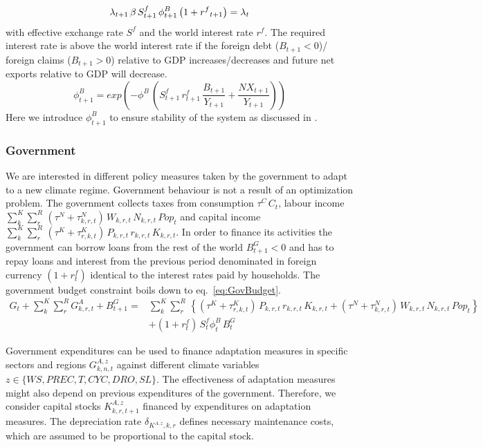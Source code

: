 \documentclass[10pt,a4paper]{article}
\begin{document}
\begin{dmath}\label{eq:hhfocbonds}
\lambda_{t+1} \, \beta \, S^{f}_{t+1} \, \phi^{B}_{t+1} \left(1+{{r^{f}}_{t+1}}\right) = \lambda_{t} \\
\end{dmath}
with effective exchange rate $S^f$ and the world interest rate $r^f$.
The required interest rate is above the world interest rate if the foreign debt ($B_{t+1}<0$)/ foreign claims ($B_{t+1}>0$) relative to GDP increases/decreases and future net exports relative to GDP will decrease. 
\begin{dmath}
\phi^{B}_{t+1} = exp \left(-\phi^B \,(S^{f}_{t+1} \, r^{f}_{t+1} \, \frac{B_{t+1}}{Y_{t+1}}+\frac{NX_{t+1}}{Y_{t+1}})\right)
\end{dmath}
Here we introduce $\phi^{B}_{t+1}$ to ensure stability of the system as discussed in \cite{schmitt2003closing}.


\subsubsection{Government}

We are interested in different policy measures taken by the government to adapt to a new climate regime. Government behaviour is not a result of an optimization problem. The government collects taxes from consumption $\tau^{C} \, C_{t}$, labour income $\sum_{k}^{K} \sum_{r}^{R} \, (\tau^{N} + \tau_{k,r,t}^{N}) \, W_{k,r,t} \, N_{k,r,t} \, Pop_{t}$ and capital income $\sum_{k}^{K} \sum_{r}^{R} \, (\tau^{K} + \tau_{r,k,t}^{K}) \, P_{k,r,t} \, r_{k,r,t} \, K_{k,r,t}$. In order to finance its activities the government can borrow loans from the rest of the world $B^{G}_{t+1}<0$ and has to repay loans and interest from the previous period denominated in foreign currency $(1 + r^{f}_{t})$ identical to the interest rates paid by households. The government budget constraint boils down to eq.~\ref{eq:GovBudget}.
\begin{align}\label{eq:GovBudget}
G_{t} + \sum_{k}^{K} \sum_{r}^{R} G^{A}_{k,r,t} + B^G_{t+1} =& \sum_{k}^{K} \sum_{r}^{R} \, \left\lbrace (\tau^{K} + \tau_{r,k,t}^{K}) \, P_{k,r,t} \, r_{k,r,t} \, K_{k,r,t} + (\tau^{N} + \tau_{k,r,t}^{N}) \, W_{k,r,t} \, N_{k,r,t} \, Pop_{t} \right\rbrace \nonumber \\
& + (1 + r^{f}_{t}) \, S^{f}_{t} \phi^{B}_{t} \, B^G_{t}
\end{align}

Government expenditures can be used to finance adaptation measures in specific sectors and regions $G^{A,z}_{k,n,t}$ against different climate variables $z \in \{WS,PREC,T,CYC,DRO,SL\}$. The effectiveness of adaptation measures might also depend on previous expenditures of the government. Therefore, we consider capital stocks $K^{A,z}_{k,r,t+1}$ financed by expenditures on adaptation measures. The depreciation rate $\delta_{K^{A,z},k,r}$ defines necessary maintenance costs, which are assumed to be proportional to the capital stock.  
\end{document}
